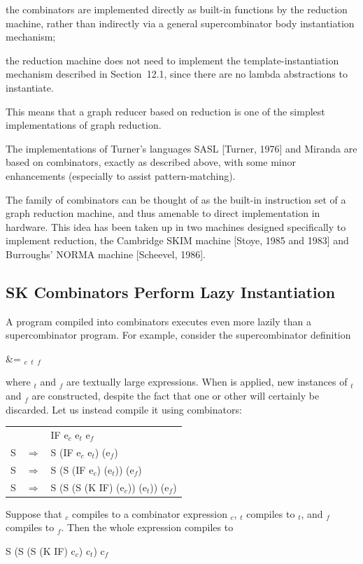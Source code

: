 \begin{numbered}
    \item the combinators are implemented directly as built-in functions by the
    reduction machine, rather than indirectly via a general supercombinator
    body instantiation mechanism;
    \item the reduction machine does not need to implement the template-instantiation mechanism described in Section~12.1, since there are no
    lambda abstractions to instantiate.
\end{numbered}
This means that a graph reducer based on  reduction is one of the simplest
implementations of graph reduction.

The implementations of Turner's languages SASL [Turner, 1976] and
Miranda are based on  combinators, exactly as described above, with some
minor enhancements (especially to assist pattern-matching).

The family of  combinators can be thought of as the built-in instruction
set of a graph reduction machine, and thus amenable to direct implementation in hardware. This idea has been taken up in two machines designed
specifically to implement  reduction, the Cambridge SKIM machine
[Stoye, 1985 and 1983] and Burroughs' NORMA machine [Scheevel, 1986].

\subsection{SK Combinators Perform Lazy Instantiation}

A program compiled into  combinators executes even more lazily than a
supercombinator program. For example, consider the supercombinator
definition
\begin{letalign}
     &= $_c$ $_t$ $_f$
\end{letalign}
where $_t$ and $_f$ are textually large expressions. When  is applied, new
instances of $_t$ and $_f$ are constructed, despite the fact that one or other will
certainly be discarded. Let us instead compile it using  combinators:
\begin{mlcoded}
    \begin{tabular}{@{}l@{\qquad}l@{\quad}l@{}}
        & & \tlb{x}IF e$_c$ e$_t$ e$_f$ \\
        S & $\Rightarrow$ & S (\tlb{x}IF e$_c$ e$_t$) (\tlb{x}e$_f$) \\
        S & $\Rightarrow$ & S (S (\tlb{x}IF e$_c$) (\tlb{x}e$_t$)) (\tlb{x}e$_f$) \\
        S & $\Rightarrow$ & S (S (S (K IF) (\tlb{x}e$_c$)) (\tlb{x}e$_t$)) (\tlb{x}e$_f$)
    \end{tabular}
\end{mlcoded}
Suppose that $_c$\ml{)} compiles to a combinator expression $_c$, $_t$\ml{)} compiles
to $_t$, and $_f$\ml{)} compiles to $_f$. Then the whole expression compiles to
\begin{mlcoded}
    S (S (S (K IF) c$_c$) c$_t$) c$_f$
\end{mlcoded}

